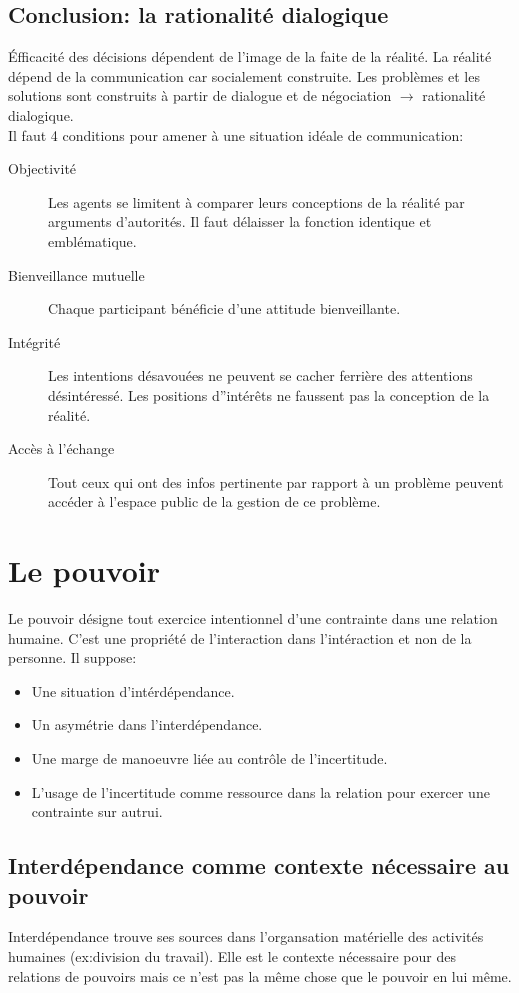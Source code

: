 \documentclass[11pt]{article} %
\begin{document}
	\subsection{Conclusion: la rationalité dialogique}
		Éfficacité des décisions dépendent de l'image de la faite de la réalité. La réalité dépend de la
		communication car socialement construite. Les problèmes et les solutions sont construits à partir
		de dialogue et de négociation $\to$ rationalité dialogique.\\
		Il faut 4 conditions pour amener à une situation idéale de communication:
		\begin{description}
			\item[Objectivité] Les agents se limitent à comparer leurs conceptions de la réalité par arguments
			d'autorités. Il faut délaisser la fonction identique et emblématique.
			\item[Bienveillance mutuelle] Chaque participant bénéficie d'une attitude bienveillante.
			\item[Intégrité] Les intentions désavouées ne peuvent se cacher ferrière des attentions 
			désintéressé. Les positions d''intérêts ne faussent pas la conception de la réalité.
			\item[Accès à l'échange] Tout ceux qui ont des infos pertinente par rapport à un problème peuvent
			accéder à l'espace public de la gestion de ce problème. 
		\end{description}

	

\section{Le pouvoir}
	Le pouvoir désigne tout exercice intentionnel d'une contrainte dans une relation humaine. C'est une
	propriété de l'interaction dans l'intéraction et non de la personne. Il suppose:
	\begin{itemize}
		\item Une situation d'intérdépendance.
		\item Un asymétrie dans l'interdépendance.
		\item Une marge de manoeuvre liée au contrôle de l'incertitude.
		\item L'usage de l'incertitude comme ressource dans la relation pour exercer une contrainte sur autrui.
	\end{itemize}
	\subsection{Interdépendance comme contexte nécessaire au pouvoir}
		Interdépendance trouve ses sources dans l'organsation matérielle des activités humaines (ex:division du travail).
		Elle est le contexte nécessaire pour des relations de pouvoirs mais ce n'est pas la même chose que le pouvoir en lui même.
\end{document}

